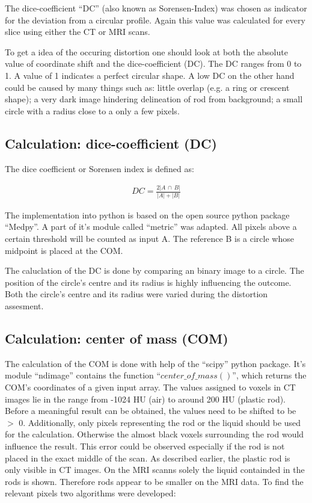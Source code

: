 \documentclass[parskip,bibtotoc,final,twoside=false,titlepage,a4paper,english,12pt,titlepage,a4paper]{scrbook}
\begin{document}

The dice-coefficient ``DC'' (also known as Sorensen-Index) was chosen as indicator for the deviation from a circular profile. Again this value was calculated for every slice using either the CT or MRI scans.

To get a idea of the occuring distortion one should look at both the absolute value of coordinate shift and the dice-coefficient (DC).
The DC ranges from 0 to 1. A value of 1 indicates a perfect circular shape. A low DC on the other hand could be caused by many things such as:
little overlap (e.g. a ring or crescent shape); a very dark image hindering delineation of rod from background; a small circle with a radius close to a only a few pixels.



\subsection{Calculation: dice-coefficient (DC)}

The dice coefficient or Sorensen index \cite{MedPy_dc-doc} is defined as:

\begin{align}
DC = \frac{2 |A \, \cap \, B|}{|A| + |B|}
\end{align}

The implementation into python is based on the open source python package ``Medpy''. \cite{MedPy} A part of it's module called ``metric'' was adapted. \cite{MedPy_dc-code}
All pixels above a certain threshold will be counted as input A. The reference B is a circle whose midpoint is placed at the COM.

The caluclation of the DC is done by comparing an binary image to a circle. The position of the circle's centre and its radius is highly influencing the outcome.
Both the circle's centre and its radius were varied during the distortion assesment.


\subsection{Calculation: center of mass (COM)}

The calculation of the COM is done with help of the ``scipy'' python package.
It's module ``ndimage'' contains the function ``$center\_of\_mass()$'', which returns the COM's coordinates of a given input array.
The values assigned to voxels in CT images lie in the range from -1024 HU (air) to around 200 HU (plastic rod).
Before a meaningful result can be obtained, the values need to be shifted to be $>$ 0.
Additionally, only pixels representing the rod or the liquid should be used for the calculation.
Otherwise the almost black voxels surrounding the rod would influence the result.
This error could be observed especially if the rod is not placed in the exact middle of the scan.
As described earlier, the plastic rod is only visible in CT images. On the MRI scanns solely the liquid containded in the rods is shown. Therefore rods appear to be smaller on the MRI data.
To find the relevant pixels two algorithms were developed:
\end{document}
